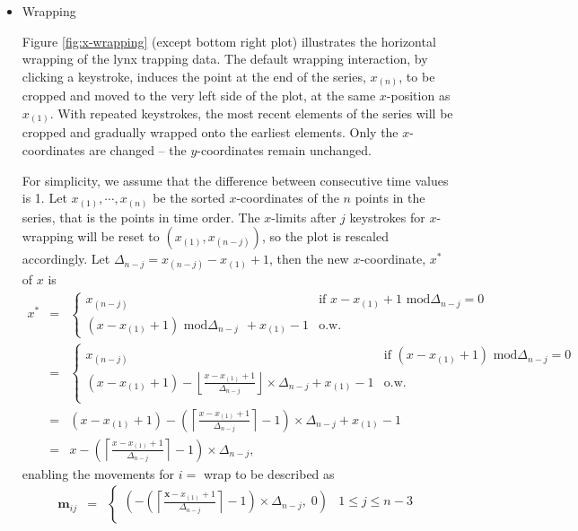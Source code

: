 \documentclass[12pt]{article}
\begin{document}
\begin{itemize}

\item Wrapping

Figure \ref{fig:x-wrapping} (except bottom right plot)
illustrates the horizontal wrapping of the lynx trapping data.
The default wrapping interaction, by clicking a keystroke,
induces the point at the end of the series, $x_{(n)}$, to be
cropped and moved to the very left side of the plot, at the
same $x$-position as $x_{(1)}$. With repeated keystrokes, the
most recent elements of the series will be cropped and gradually
wrapped onto the earliest elements. Only the $x$-coordinates
are changed -- the $y$-coordinates remain unchanged.

For simplicity, we assume that the difference between consecutive
time values is 1. Let  $x_{(1)},\cdots,x_{(n)}$ be the sorted
$x$-coordinates of the $n$ points in the series, that is the
points in time order. The $x$-limits after $j$ keystrokes for
$x$-wrapping will be reset to $(x_{(1)}, x_{(n-j)})$, so the
plot is rescaled accordingly. Let $\Delta_{n-j}=x_{(n-j)}-x_{(1)}+1$,
then the new $x$-coordinate, $x^*$ of $x$ is
\begin{eqnarray*}
x^* & = & \begin{cases}
x_{(n-j)}  & \mbox{if~} x-x_{(1)}+1 \mbox{~mod}\Delta_{n-j} = 0\\
(x-x_{(1)}+1) \mbox{~mod}\Delta_{n-j} ~~+x_{(1)}-1 &  \mbox{o.w.}
\end{cases} \\ 
& = & \begin{cases}
x_{(n-j)}  & \mbox{if~} (x-x_{(1)}+1) \mbox{~mod}\Delta_{n-j} = 0\\
(x-x_{(1)}+1)-\left\lfloor\frac{x-x_{(1)}+1}{\Delta_{n-j}}\right\rfloor\times\Delta_{n-j}+x_{(1)}-1 &\mbox{o.w.}\\
\end{cases} \\
 & = &
(x-x_{(1)}+1)-\left(\left\lceil\frac{x-x_{(1)}+1}{\Delta_{n-j}}\right\rceil -1\right)\times \Delta_{n-j} +x_{(1)}-1 \\ & = &
x-\left(\left\lceil \frac{x-x_{(1)}+1}{\Delta_{n-j}}\right\rceil -1\right)\times\Delta_{n-j},
\end{eqnarray*}
enabling the movements for $i=$ wrap to be described as
\begin{eqnarray*}
\mathbf{m}{}_{ij} & = & \begin{cases}
(-\left(\left\lceil \frac{\mathbf{x}-x_{(1)}+1}{\Delta_{n-j}}\right\rceil -1\right)\times\Delta_{n-j}, \; 0) & 1\leq j \leq n-3 \\

\end{cases}
\end{eqnarray*}
\end{itemize}
\end{document}
